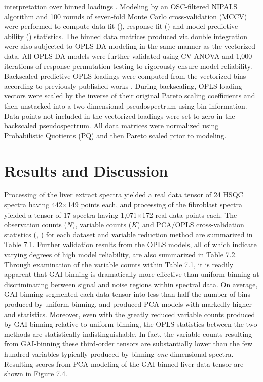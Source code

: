 \begin{doublespace}
interpretation over binned loadings \cite{wiklund:anchem2008}.
Modeling by an OSC-filtered NIPALS algorithm
\cite{trygg:jchemo2002} and 100 rounds of seven-fold Monte Carlo
cross-validation (MCCV) \cite{xu:jchemo2004} were performed to
compute data fit (\rsqx{}), response fit (\rsqy{}) and model predictive ability
(\qsq{}) statistics. The binned data matrices produced via double integration
were also subjected to OPLS-DA modeling in the same manner as the vectorized
data. All OPLS-DA models were further validated using CV-ANOVA
\cite{eriksson:jchemo2008} and 1,000 iterations of response
permutation testing \cite{westerhuis:metab2008a} to rigorously ensure
model reliability. Backscaled predictive OPLS loadings were computed from the
vectorized bins according to previously published works
\cite{cloarec:anchem2005a,hedenstrom:cils2008}. During backscaling,
OPLS loading vectors were scaled by the inverse of their original Pareto
scaling coefficients and then unstacked into a two-dimensional pseudospectrum
using bin information. Data points not included in the vectorized loadings were
set to zero in the backscaled pseudospectrum. All data matrices were normalized
using Probabilistic Quotients (PQ) \cite{dieterle:anchem2006} and then
Pareto scaled \cite{vandenberg:bmcg2006} prior to modeling.
\end{doublespace}

\section{Results and Discussion}

\begin{doublespace}
Processing of the liver extract spectra yielded a real data tensor of 24
\hcnmr{} HSQC spectra having 442$\times$149 points each, and processing of the
fibroblast spectra yielded a tensor of 17 spectra having 1,071$\times$172
real data points each. The observation counts ($N$), variable counts ($K$)
and PCA/OPLS cross-validation statistics (\rsq{}, \qsq{}) for each dataset and
variable reduction method are summarized in Table 7.1. Further validation
results from the OPLS models, all of which indicate varying degrees of high
model reliability, are also summarized in Table 7.2. Through examination of the
variable counts within Table 7.1, it is readily apparent that GAI-binning is
dramatically more effective than uniform binning at discriminating between
signal and noise regions within spectral data. On average, GAI-binning
segmented each data tensor into less than half the number of bins produced by
uniform binning, and produced PCA models with markedly higher \rsqx{} and
\qsq{} statistics. Moreover, even with the greatly reduced variable counts
produced by GAI-binning relative to uniform binning, the OPLS \qsq{} statistics
between the two methods are statistically indistinguishable. In fact, the
variable counts resulting from GAI-binning these third-order tensors are
substantially lower than the few hundred variables typically produced by
binning {\it one}-dimensional spectra. Resulting scores from PCA modeling
of the GAI-binned liver data tensor are shown in Figure 7.4.
\end{doublespace}

